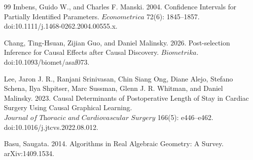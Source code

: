 \documentclass{article}
\begin{document}
\begin{thebibliography}{99}
   Imbens, Guido W., and Charles F. Manski. 2004. Confidence Intervals for Partially Identified Parameters. \(\textit{Econometrica}\) 72(6): 1845--1857. doi:10.1111/j.1468-0262.2004.00555.x.

   Chang, Ting-Hsuan, Zijian Guo, and Daniel Malinsky. 2026. Post-selection Inference for Causal Effects after Causal Discovery. \(\textit{Biometrika}\). doi:10.1093/biomet/asaf073.

   Lee, Jaron J. R., Ranjani Srinivasan, Chin Siang Ong, Diane Alejo, Stefano Schena, Ilya Shpitser, Marc Sussman, Glenn J. R. Whitman, and Daniel Malinsky. 2023. Causal Determinants of Postoperative Length of Stay in Cardiac Surgery Using Causal Graphical Learning. \(\textit{Journal of Thoracic and Cardiovascular Surgery}\) 166(5): e446--e462. doi:10.1016/j.jtcvs.2022.08.012.

   Basu, Saugata. 2014. Algorithms in Real Algebraic Geometry: A Survey. arXiv:1409.1534.

\end{thebibliography}
\end{document}
